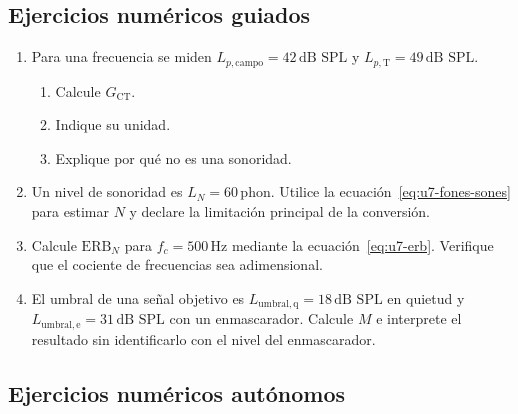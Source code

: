 \subsection*{Ejercicios numéricos guiados}

\begin{enumerate}[label=\textbf{G\arabic*.},leftmargin=*]
    \item Para una frecuencia se miden
    \(L_{p,\mathrm{campo}}=42\,\text{dB SPL}\) y
    \(L_{p,\mathrm{T}}=49\,\text{dB SPL}\).
    \begin{enumerate}
        \item Calcule \(G_{\mathrm{CT}}\).
        \item Indique su unidad.
        \item Explique por qué no es una sonoridad.
    \end{enumerate}

    \item Un nivel de sonoridad es \(L_N=60\,\text{phon}\). Utilice la
    ecuación~\eqref{eq:u7-fones-sones} para estimar \(N\) y declare la
    limitación principal de la conversión.

    \item Calcule \(\mathrm{ERB}_{N}\) para
    \(f_c=500\,\text{Hz}\) mediante la ecuación~\eqref{eq:u7-erb}. Verifique
    que el cociente de frecuencias sea adimensional.

    \item El umbral de una señal objetivo es
    \(L_{\mathrm{umbral,q}}=18\,\text{dB SPL}\) en quietud y
    \(L_{\mathrm{umbral,e}}=31\,\text{dB SPL}\) con un enmascarador.
    Calcule \(M\) e interprete el resultado sin identificarlo con el nivel del
    enmascarador.
\end{enumerate}

\subsection*{Ejercicios numéricos autónomos}

